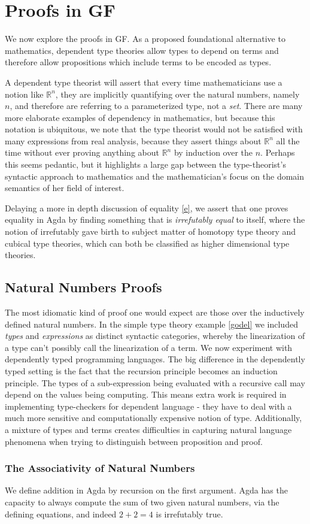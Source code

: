 \section{Proofs in GF} \label{npf}

We now explore the proofs in GF. As a proposed
foundational alternative to mathematics, dependent type theories allow types to
depend on terms and therefore allow propositions which include terms to be
encoded as types.

A dependent type theorist will assert that every time mathematicians use a
notion like $\mathbb{R}^n$, they are implicitly quantifying over the natural
numbers, namely $n$, and therefore are referring to a parameterized type, not a
\emph{set}. There are many more elaborate examples of dependency in mathematics,
but because this notation is ubiquitous, we note that the type theorist would
not be satisfied with many expressions from real analysis, because they assert
things about $\mathbb{R}^n$ all the time without ever proving anything about
$\mathbb{R}^n$ by induction over the $n$. Perhaps this seems pedantic, but
it highlights a large gap between the type-theorist's syntactic approach to
mathematics and the mathematician's focus on the domain semantics of her field
of interest.

Delaying a more in depth discussion of equality \ref{e}, we assert that one
proves equality in Agda by finding something that is \emph{irrefutably equal} to
itself, where the notion of irrefutably gave birth to subject matter of homotopy
type theory and cubical type theories, which can both be classified as higher
dimensional type theories.

\subsection{Natural Numbers Proofs} \label{assoc}

The most idiomatic kind of proof one would expect are those over the inductively
defined natural numbers. In the simple type theory example \ref{godel} we
included \emph{types} and \emph{expressions} as distinct syntactic categories,
whereby the linearization of a type can't possibly call the linearization of a
term. We now experiment with dependently typed programming languages. The big
difference in the dependently typed setting is the fact that the recursion
principle becomes an induction principle. The types of a sub-expression being
evaluated with a recursive call may depend on the values being computing. This
means extra work is required in implementing type-checkers for dependent
language - they have to deal with a much more sensitive and computationally
expensive notion of type. Additionally, a mixture of types and terms creates
difficulties in capturing natural language phenomena when trying to distinguish
between proposition and proof.

\subsubsection{The Associativity of Natural Numbers} \label{npf}

We define addition in Agda by recursion on the first argument. Agda has
the capacity to always compute the sum of two given natural numbers, via the
defining equations, and indeed $2+2=4$ is irrefutably true.


